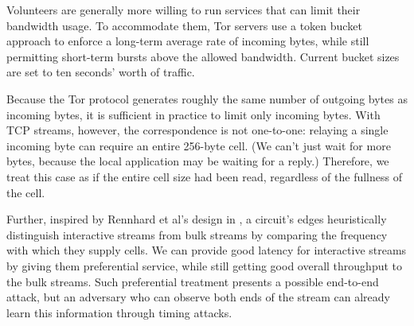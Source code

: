 \documentclass[times,10pt,twocolumn]{article}
\begin{document}

Volunteers are generally more willing to run services that can limit
their bandwidth usage. To accommodate them, Tor servers use a
token bucket approach \cite{tannenbaum96} to 
enforce a long-term average rate of incoming bytes, while still
permitting short-term bursts above the allowed bandwidth. Current bucket
sizes are set to ten seconds' worth of traffic.


Because the Tor protocol generates roughly the same number of outgoing
bytes as incoming bytes, it is sufficient in practice to limit only
incoming bytes.
With TCP streams, however, the correspondence is not one-to-one:
relaying a single incoming byte can require an entire 256-byte cell.
(We can't just wait for more bytes, because the local application may
be waiting for a reply.)
Therefore, we treat this case as if the entire
cell size had been read, regardless of the fullness of the cell.

Further, inspired by Rennhard et al's design in \cite{anonnet}, a
circuit's edges heuristically distinguish interactive streams from bulk
streams by comparing the frequency with which they supply cells.  We can
provide good latency for interactive streams by giving them preferential
service, while still getting good overall throughput to the bulk
streams. Such preferential treatment presents a possible end-to-end
attack, but an adversary who can observe both
ends of the stream can already learn this information through timing
attacks.
\end{document}
